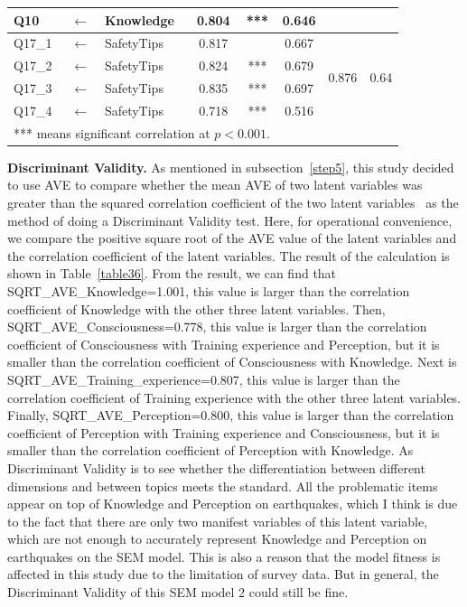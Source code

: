 \begin{table}[h]
\begin{tabular}{lcl|cc|ccc}
Q10                  & $\longleftarrow$       & Knowledge            & 0.804  & ***                  & 0.646                &                        &                        \\
\hline
Q17\_1               & $\longleftarrow$       & SafetyTips           & 0.817  &  & 0.667                & \multirow{4}{*}{0.876} & \multirow{4}{*}{0.64}  \\
Q17\_2               & $\longleftarrow$       & SafetyTips           & 0.824  & ***                  & 0.679                &                        &                        \\
Q17\_3               & $\longleftarrow$       & SafetyTips           & 0.835  & ***                  & 0.697                &                        &                        \\
Q17\_4               & $\longleftarrow$       & SafetyTips           & 0.718  & ***                  & 0.516                &                        &                       \\
  \hline
\multicolumn{5}{l}{*** means significant correlation at $p<0.001$.}
  \end{tabular}
\end{table}




\textbf{Discriminant Validity.} As mentioned in subsection~\ref{step5}, this study decided to use AVE to compare whether the mean AVE of two latent variables was greater than the squared correlation coefficient of the two latent variables~\cite{ref31} as the method of doing a Discriminant Validity test. Here, for operational convenience, we compare the positive square root of the AVE value of the latent variables and the correlation coefficient of the latent variables. The result of the calculation is shown in Table~\ref{table36}. From the result, we can find that SQRT\_AVE\_Knowledge=1.001, this value is larger than the correlation coefficient of Knowledge with the other three latent variables. Then, SQRT\_AVE\_Consciousness=0.778, this value is larger than the correlation coefficient of Consciousness with Training experience and Perception, but it is smaller than the correlation coefficient of Consciousness with Knowledge. Next is SQRT\_AVE\_Training\_experience=0.807, this value is larger than the correlation coefficient of Training experience with the other three latent variables. Finally, SQRT\_AVE\_Perception=0.800, this value is larger than the correlation coefficient of Perception with Training experience and Consciousness, but it is smaller than the correlation coefficient of Perception with Knowledge. As Discriminant Validity is to see whether the differentiation between different dimensions and between topics meets the standard. All the problematic items appear on top of Knowledge and Perception on earthquakes, which I think is due to the fact that there are only two manifest variables of this latent variable, which are not enough to accurately represent Knowledge and Perception on earthquakes on the SEM model. This is also a reason that the model fitness is affected in this study due to the limitation of survey data. But in general, the Discriminant Validity of this SEM model 2 could still be fine.

